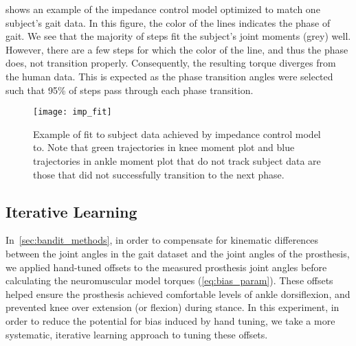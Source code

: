  shows an example of the impedance control model
optimized to match one subject's gait data. In this figure, the color of the
lines indicates the phase of gait. We see that the majority of steps fit the
subject's joint moments (grey) well. However, there are a few steps for which
the color of the line, and thus the phase does, not transition properly.
Consequently, the resulting torque diverges from the human data. This is
expected as the phase transition angles were selected such that 95\% of steps
pass through each phase transition.
\begin{figure}[t]
    \centering 
    \texttt{[image: imp\_fit]}
    \caption[Example of fit to subject data achieved by impedance control
    model]{Example of fit to subject data achieved by impedance control model
    to. Note that green trajectories in knee moment plot and blue trajectories
    in ankle moment plot that do not track subject data are those that did not
    successfully transition to the next phase.}\label{fig:treadmill_imp_fit}
\end{figure}

\subsection{Iterative Learning}\label{sec:treadmill_exp_iterative_learning}
In~\cref{sec:bandit_methods}, in order to compensate for kinematic differences
between the joint angles in the gait dataset and the joint angles of the
prosthesis, we applied hand-tuned offsets to the measured prosthesis joint
angles before calculating the neuromuscular model torques
(\cref{eq:bias_param}). These offsets helped ensure the prosthesis achieved
comfortable levels of ankle dorsiflexion, and prevented knee over extension (or
flexion) during stance. In this experiment, in order to reduce the potential for
bias induced by hand tuning, we take a more systematic, iterative learning
approach to tuning these offsets.

